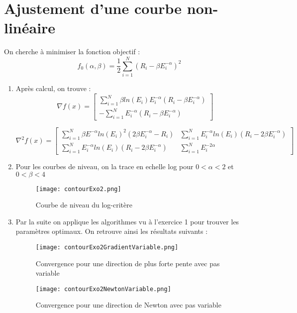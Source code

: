 \documentclass[12pt,a4paper,titlepage]{article}
\begin{document}
\section{Ajustement d'une courbe non-linéaire}
	On cherche à minimiser la fonction objectif :	
	$$
		f_0( \alpha,\beta ) =  \frac{ 1}{2}  \sum_{i=1}^{N} ( R_i - \beta E_i^{-\alpha} )^2
	$$
\begin{enumerate}
    \item{
    	Après calcul, on trouve :
	$$
	\nabla f(x) = \left[
                \begin{array}{c}
                    \sum_{i=1}^{N} \beta ln(E_i)E_i^{-\alpha} (R_i-\beta E_i^{-\alpha} )\\
                     - \sum_{i=1}^{N} E_i^{-\alpha} (R_i-\beta E_i^{-\alpha})
                \end{array}
            \right]
	$$
	
	$$
	  \nabla ^2f(x)=\left[
                \begin{array}{cc}
                    \sum_{i=1}^{N} \beta E^{-\alpha} ln(E_i)^2 (2\beta E_i^{-\alpha}-R_i) &  \sum_{i=1}^{N} E_i^{-\alpha}ln(E_i) (R_i -2\beta E_i^{-\alpha}) \\
                    \sum_{i=1}^{N} E_i^{-\alpha}ln(E_i) (R_i -2\beta E_i^{-\alpha}) &  \sum_{i=1}^{N} E_i^{-2\alpha}
                \end{array}
            \right]
	$$
    }
    
    \item{
    Pour les courbes de niveau, on la trace en echelle log pour $ 0< \alpha < 2$ et $ 0 < \beta <4$
    	\begin{figure}[H]
                \centering
                \texttt{[image: contourExo2.png]}
                \caption{Courbe de niveau du log-critère}
            \end{figure}
    }
    
    \item{Par la suite on applique les algorithmes vu à l'exercice 1 pour trouver les paramètres optimaux. On retrouve ainsi les résultats suivants :
    	\begin{figure}[H]
                \centering
                \texttt{[image: contourExo2GradientVariable.png]}
                \caption{Convergence pour une direction de plus forte pente avec pas variable}
            \end{figure}
            
            \begin{figure}[H]
                \centering
                \texttt{[image: contourExo2NewtonVariable.png]}
                \caption{Convergence pour une direction de Newton avec pas variable}
            \end{figure}
            
}
\end{enumerate}
\end{document}
